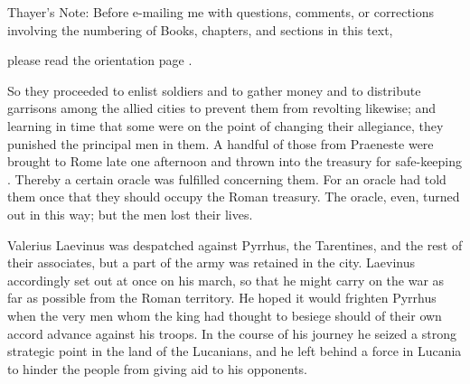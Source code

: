 Thayer's Note: Before e-mailing me with questions, comments, or corrections involving the numbering of Books, chapters, and sections in this text,

please read the orientation page .

So they proceeded to enlist soldiers and to gather money and to distribute garrisons among the allied cities to prevent them from revolting likewise; and learning in time that some were on the point of changing their allegiance, they punished the principal men in them. A handful of those from Praeneste were brought to Rome late one afternoon and thrown into the treasury for safe-keeping . Thereby a certain oracle was fulfilled concerning them. For an oracle had told them once that they should occupy the Roman treasury. The oracle, even, turned out in this way; but the men lost their lives.

Valerius Laevinus was despatched against Pyrrhus, the Tarentines, and the rest of their associates, but a part of the army was retained in the city. Laevinus accordingly set out at once on his march, so that he might carry on the war as far as possible from the Roman territory. He hoped it would frighten Pyrrhus when the very men whom the king had thought to besiege should of their own accord advance against his troops. In the course of his journey he seized a strong strategic point in the land of the Lucanians, and he left behind a force in Lucania to hinder the people from giving aid to his opponents.

